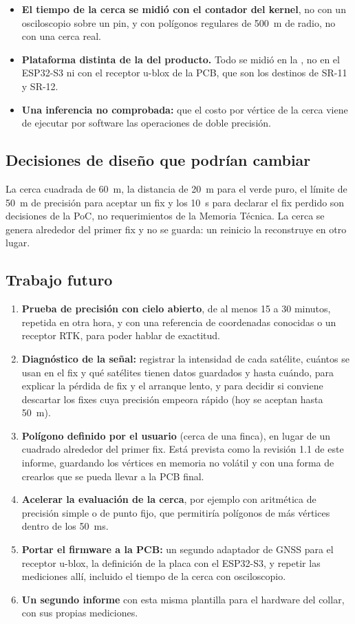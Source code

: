 \begin{itemize}
        intensidad de señal.
  \item \textbf{El tiempo de la cerca se midió con el contador del kernel}, no con un osciloscopio sobre un pin, y
        con polígonos regulares de 500~m de radio, no con una cerca real.
  \item \textbf{Plataforma distinta de la del producto.} Todo se midió en la \dSoc{}, no en el ESP32-S3 ni con el
        receptor u-blox de la PCB, que son los destinos de SR-11 y SR-12.
  \item \textbf{Una inferencia no comprobada:} que el costo por vértice de la cerca viene de ejecutar por software
        las operaciones de doble precisión.
\end{itemize}

\subsection{Decisiones de diseño que podrían cambiar}

La cerca cuadrada de 60~m, la distancia de 20~m para el verde puro, el límite de 50~m de precisión para
aceptar un fix y los 10~s para declarar el fix perdido son decisiones de la PoC, no requerimientos de la
Memoria Técnica. La cerca se genera alrededor del primer fix y no se guarda: un reinicio la reconstruye en
otro lugar.

\subsection{Trabajo futuro}

\begin{enumerate}
  \item \textbf{Prueba de precisión con cielo abierto}, de al menos 15 a 30 minutos, repetida en otra hora, y con
        una referencia de coordenadas conocidas o un receptor RTK, para poder hablar de exactitud.
  \item \textbf{Diagnóstico de la señal:} registrar la intensidad de cada satélite, cuántos se usan en el fix y
        qué satélites tienen datos guardados y hasta cuándo, para explicar la pérdida de fix y el arranque lento, y para decidir si conviene descartar los fixes cuya
        precisión empeora rápido (hoy se aceptan hasta 50~m).
  \item \textbf{Polígono definido por el usuario} (cerca de una finca), en lugar de un cuadrado alrededor del
        primer fix. Está prevista como la revisión 1.1 de este informe, guardando los vértices en memoria no
        volátil y con una forma de crearlos que se pueda llevar a la PCB final.
  \item \textbf{Acelerar la evaluación de la cerca}, por ejemplo con aritmética de precisión simple o de punto
        fijo, que permitiría polígonos de más vértices dentro de los 50~ms.
  \item \textbf{Portar el firmware a la PCB:} un segundo adaptador de GNSS para el receptor u-blox, la definición
        de la placa con el ESP32-S3, y repetir las mediciones allí, incluido el tiempo de la cerca con osciloscopio.
  \item \textbf{Un segundo informe} con esta misma plantilla para el hardware del collar, con sus propias mediciones.
\end{enumerate}
